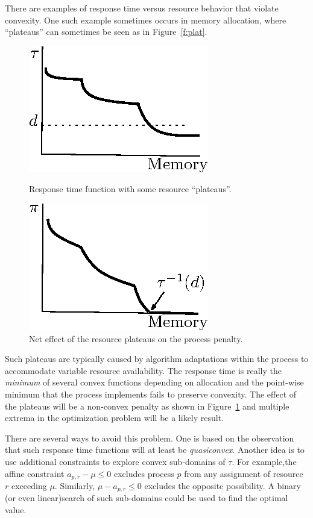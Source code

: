 There are examples of response time versus resource behavior that violate convexity.  One such example sometimes occurs in memory allocation, where ``plateaus'' can sometimes be seen as in Figure~\ref{f:plat}.
\begin{figure}[b]
\parbox{1.6in}{
\includegraphics*{Plateau1.eps}
\caption{\label{f:plat}Response time function with some resource ``plateaus''.}
}
\hspace{\fill}
\parbox{1.6in}{
\includegraphics*{Plateau2.eps}
\caption{\label{f:plateffect}Net effect of the resource plateaus on the process penalty.}
}
\end{figure}
Such plateaus are typically caused by algorithm adaptations within the process to accommodate variable resource availability.  The response time is really the \emph{minimum} of several convex functions depending on allocation and the point-wise minimum that the process implements fails to preserve convexity.  The effect of the plateaus will be a non-convex penalty as shown in Figure~\ref{f:plateffect} and multiple extrema in the optimization problem will be a likely result.

There are several ways to avoid this problem.  One is based on the observation that such response time functions will at least be \emph{quasiconvex}.  Another idea is to use additional constraints to explore convex sub-domains of $\tau$. For example,the affine constraint $a_{p,r} - \mu \leq 0$ excludes process $p$ from any assignment of resource $r$ exceeding $\mu$.  Similarly, $\mu - a_{p,r} \leq 0$ excludes the opposite possibility.
A binary (or even linear)search of such sub-domains could be used to find the optimal value.

